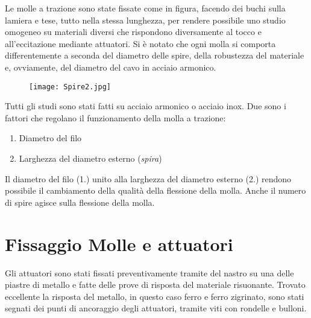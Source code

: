 Le molle a trazione sono state fissate come in figura, facendo dei buchi sulla lamiera e tese, tutto nella stessa lunghezza, per rendere possibile uno studio omogeneo su materiali diversi che rispondono diversamente al tocco e all'eccitazione mediante attuatori. Si è notato che ogni molla si comporta differentemente a seconda del diametro delle spire, della robustezza del materiale e, ovviamente, del diametro del cavo in acciaio armonico.
\begin{figure}[htbp]
        \centering
        \texttt{[image: Spire2.jpg]}
\end{figure}
Tutti gli studi sono stati fatti su acciaio armonico o acciaio inox. Due sono i fattori che regolano il funzionamento della molla a trazione:
\begin{enumerate}
\item{Diametro del filo}
\item{Larghezza del diametro esterno (\textit{spira})}
\end{enumerate}
Il diametro del filo (1.) unito alla larghezza del diametro esterno (2.) rendono possibile il cambiamento della qualità della flessione della molla. Anche il numero di spire agisce sulla flessione della molla.

\section{Fissaggio Molle e attuatori}

Gli attuatori sono stati fissati preventivamente tramite del nastro su una delle piastre di metallo e fatte delle prove di risposta del materiale risuonante. Trovato eccellente la risposta del metallo, in questo caso ferro e ferro zigrinato, sono stati segnati dei punti di ancoraggio degli attuatori, tramite viti con rondelle e bulloni.

